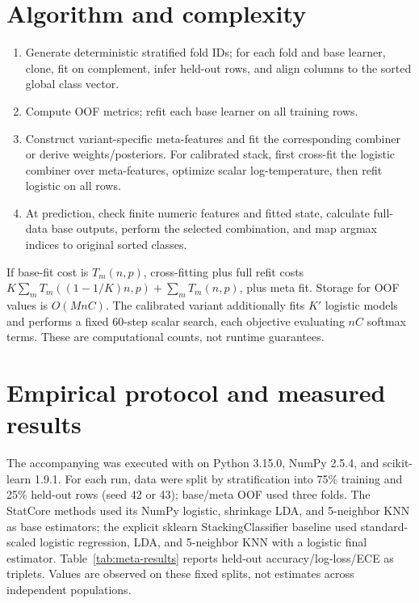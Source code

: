 ﻿\documentclass[conference]{IEEEtran}
\begin{document}
\section{Algorithm and complexity}
\begin{enumerate}[label=\textbf{A\arabic*.},leftmargin=*]
\item Generate deterministic stratified fold IDs; for each fold and base learner, clone, fit on complement, infer held-out rows, and align columns to the sorted global class vector.
\item Compute OOF metrics; refit each base learner on all training rows.
\item Construct variant-specific meta-features and fit the corresponding combiner or derive weights/posteriors. For calibrated stack, first cross-fit the logistic combiner over meta-features, optimize scalar log-temperature, then refit logistic on all rows.
\item At prediction, check finite numeric features and fitted state, calculate full-data base outputs, perform the selected combination, and map argmax indices to original sorted classes.
\end{enumerate}
If base-fit cost is \(T_m(n,p)\), cross-fitting plus full refit costs \(K\sum_mT_m((1-1/K)n,p)+\sum_mT_m(n,p)\), plus meta fit. Storage for OOF values is \(O(MnC)\). The calibrated variant additionally fits \(K'\) logistic models and performs a fixed 60-step scalar search, each objective evaluating \(nC\) softmax terms. These are computational counts, not runtime guarantees.

\section{Empirical protocol and measured results}
The accompanying  was executed with  on Python 3.15.0, NumPy 2.5.4, and scikit-learn 1.9.1. For each run, data were split by stratification into 75\% training and 25\% held-out rows (seed 42 or 43); base/meta OOF used three folds. The StatCore methods used its NumPy logistic, shrinkage LDA, and 5-neighbor KNN as base estimators; the explicit sklearn StackingClassifier baseline used standard-scaled logistic regression, LDA, and 5-neighbor KNN with a logistic final estimator. Table~\ref{tab:meta-results} reports held-out accuracy/log-loss/ECE as triplets. Values are observed on these fixed splits, not estimates across independent populations.
\end{document}
